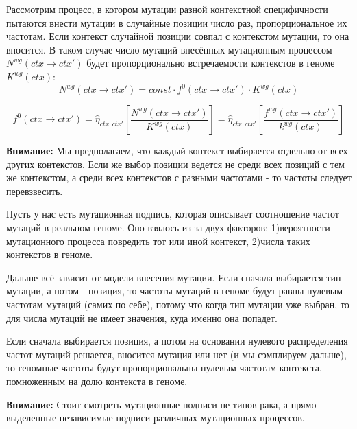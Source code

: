 \documentclass[a4paper]{article}
\begin{document}
Рассмотрим процесс, в котором мутации разной контекстной специфичности пытаются внести мутации в случайные позиции число раз, пропорциональное их частотам. Если контекст случайной позиции совпал с контекстом мутации, то она вносится. В таком случае число мутаций внесённых мутационным процессом $N^{wg}(ctx \to ctx')$ будет пропорционально встречаемости контекстов в геноме $K^{wg}(ctx)$:
\begin{equation}
	N^{wg}(ctx \to ctx') = const \cdot f^0(ctx \to ctx') \cdot K^{wg}(ctx)
\end{equation}

\begin{equation}
	f^0(ctx \to ctx') = \widehat{\eta}_{ctx, ctx'}\left[ \frac{ N^{wg}(ctx \to ctx') }{ K^{wg}(ctx) }\right] = \widehat{\eta}_{ctx, ctx'}\left[ \frac{ f^{wg}(ctx \to ctx') }{ k^{wg}(ctx) }\right]
\end{equation}



\textbf{Внимание:}
Мы предполагаем, что каждый контекст выбирается отдельно от всех других контекстов. Если же выбор позиции ведется не среди всех позиций с тем же контекстом, а среди всех контекстов с разными частотами - то частоты следует перевзвесить.

Пусть у нас есть мутационная подпись, которая описывает соотношение частот мутаций в реальном геноме. Оно взялось из-за двух факторов: 1)вероятности мутационного процесса повредить тот или иной контекст, 2)числа таких контекстов в геноме.

Дальше всё зависит от модели внесения мутации. Если сначала выбирается тип мутации, а потом - позиция, то частоты мутаций в геноме будут равны нулевым частотам мутаций (самих по себе), потому что когда тип мутации уже выбран, то для числа мутаций не имеет значения, куда именно она попадет.

Если сначала выбирается позиция, а потом на основании нулевого распределения частот мутаций решается, вносится мутация или нет (и мы сэмплируем дальше), то геномные частоты будут пропорциональны нулевым частотам контекста, помноженным на долю контекста в геноме.


\textbf{Внимание:}
Стоит смотреть мутационные подписи не типов рака, а прямо выделенные независимые подписи различных мутационных процессов.



\end{document}
